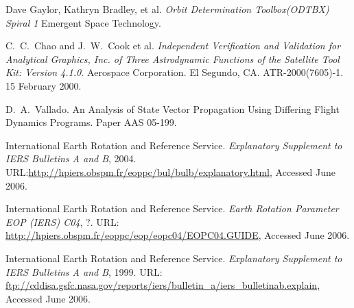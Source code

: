 \begin{thebibliography}{99}
\label{Ch:Bibliography}

Dave Gaylor, Kathryn Bradley, et al.
\newblock \textsl{Orbit Determination Toolbox(ODTBX) Spiral 1}
\newblock Emergent Space Technology.

C.~C.~Chao and J.~W.~Cook et al.
\newblock \textsl{Independent Verification and Validation for Analytical Graphics,
Inc. of Three Astrodynamic Functions of the Satellite Tool Kit:
Version 4.1.0.}
\newblock Aerospace Corporation. El Segundo, CA. ATR-2000(7605)-1. 15 February 2000.

D.~A.~Vallado.
\newblock An Analysis of State Vector Propagation Using
Differing Flight Dynamics Programs.
\newblock Paper AAS 05-199.

International Earth Rotation and Reference Service.
\newblock \textsl{Explanatory Supplement to IERS Bulletins A and B},
2004.
\newblock URL:\url{http://hpiers.obspm.fr/eoppc/bul/bulb/explanatory.html}, Accessed June 2006.

International Earth Rotation and Reference Service.
\newblock \textsl{Earth Rotation Parameter EOP (IERS) C04}, ?.
\newblock URL: \url{http://hpiers.obspm.fr/eoppc/eop/eopc04/EOPC04.GUIDE}, Accessed June 2006.

International Earth Rotation and Reference Service.
\newblock \textsl{Explanatory Supplement to IERS Bulletins A and B}, 1999.
\newblock URL: \url{ftp://cddisa.gsfc.nasa.gov/reports/iers/bulletin_a/iers_bulletinab.explain}, Accessed June 2006.

\end{thebibliography}
